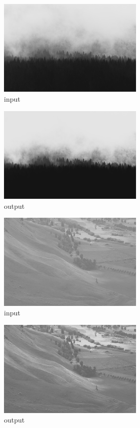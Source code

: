 \documentclass[12pt,a4paper]{article}
\theoremstyle{definition}
\theoremstyle{remark}
\theoremstyle{plain}
\begin{document}
\begin{multicols}{2}
\begin{figure}[H]
\centering
\includegraphics[width=7cm]{images/wood.jpeg}
  \caption{input}\label{tree_fuzzy_grayscale_input}
\end{figure}
\columnbreak
\begin{figure}[H]
\centering
\includegraphics[width=7cm]{images/fuzzy_grayscale_1.jpg}
  \caption{output}\label{fuzzy_grayscale_output1}
\end{figure}
\end{multicols}

\begin{multicols}{2}
\begin{figure}[H]
\centering
\includegraphics[width=7cm]{images/field.jpg}
  \caption{input}\label{tree_fuzzy_grayscale_input}
\end{figure}
\columnbreak
\begin{figure}[H]
\centering
\includegraphics[width=7cm]{images/fuzzy_grayscale_2.jpg}
  \caption{output}\label{fuzzy_grayscale_output2}
\end{figure}
\end{multicols}
\end{document}
